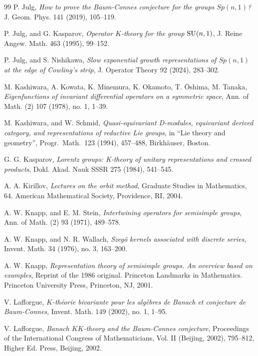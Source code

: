 \documentclass[a4paper,reqno]{amsart}
\numberwithin{equation}{section}
\theoremstyle{definition}
\theoremstyle{remark}
\begin{document}
\begin{thebibliography}{99}
 P. Julg, \emph{How to prove the Baum-Connes conjecture for the groups $Sp(n,1)$?} J. Geom. Phys. 141 (2019), 105--119.

 P. Julg, and G. Kasparov, \emph{Operator $K$-theory for the group ${\rm SU}(n,1)$}, J. Reine Angew. Math. 463 (1995), 99--152.

 P. Julg, and S. Nishikawa, \emph{Slow exponential growth representations of $Sp(n, 1)$ at the edge of Cowling's strip},  J. Operator Theory 92 (2024), 283--302.

 M. Kashiwara, A. Kowata, K. Minemura, K. Okamoto, T. Ōshima, M. Tanaka, \emph{Eigenfunctions of invariant differential operators on a symmetric space}, Ann. of Math. (2) 107 (1978), no. 1, 1--39.

 M. Kashiwara, and W. Schmid, \emph{Quasi-equivariant D-modules, equivariant
derived category, and representations of reductive Lie groups}, in ``Lie theory and geometry'', Progr.~Math.~123 (1994), 457--488, Birkh\"{a}user, Boston.


 G. G. Kasparov, \emph{Lorentz groups: K-theory of unitary representations and crossed products}, Dokl. Akad.
Nauk SSSR 275 (1984), 541--545.


  A. A. Kirillov, \emph{Lectures on the orbit method}, Graduate Studies in Mathematics, 64. American Mathematical Society, Providence, RI, 2004.

 A. W. Knapp, and E. M. Stein, \emph{Intertwining operators for semisimple groups}, Ann. of Math. (2) 93 (1971), 489--578.

 A. W. Knapp, and N. R. Wallach, \emph{Szegö kernels associated with discrete series}, Invent. Math. 34 (1976), no. 3, 163--200.


 A. W. Knapp, \emph{Representation theory of semisimple groups. An overview based on examples}, Reprint of the 1986 original. Princeton Landmarks in Mathematics. Princeton University Press, Princeton, NJ, 2001.

 V. Lafforgue, \emph{$K$-théorie bivariante pour les algèbres de Banach et conjecture de Baum-Connes}, Invent. Math. 149 (2002), no. 1, 1--95.

 V. Lafforgue, \emph{Banach $KK$-theory and the Baum-Connes conjecture}, Proceedings of the International Congress of Mathematicians, Vol. II (Beijing, 2002), 795--812, Higher Ed. Press, Beijing, 2002.


\end{thebibliography}
\end{document}
